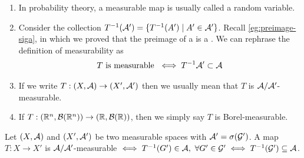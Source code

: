 \begin{remark}$ $\newline
	\begin{enumerate}
		\item In probability theory, a measurable map is usually called a random variable.
		\item Consider the collection ${T}^{-1}(\mathcal{A}') = \{{T}^{-1}(A') \mid A' \in \mathcal{A}'\}$. Recall \autoref{eg:preimage-siga}, in which we proved that the preimage of a \siga is a \siga. We can rephrase the definition of measurability as
		\begin{align*}
			T \text{ is measurable } \iff {T}^{-1}\mathcal{A}' \subset \mathcal{A}
		\end{align*}
		\item If we write $T: (X, \mathcal{A}) \to (X', \mathcal{A}')$ then we usually mean that $T$ is $\mathcal{A}/\mathcal{A}'$-measurable.
		
		\item If $T: (\mathbb{R}^n, \mathcal{B}(\mathbb{R}^n)) \to (\mathbb{R}, \mathcal{B}(\mathbb{R}))$, then we simply say $T$ is Borel-measurable.
	\end{enumerate}
\end{remark}

\begin{lem}
	\label{lem:measurable-generators}
	Let $(X, \mathcal{A})$ and $(X', \mathcal{A}')$ be two measurable spaces with $\mathcal{A}' = \sigma(\mathcal{G}')$. A map $T: X \to X'$ is $\mathcal{A}/\mathcal{A}'$-measurable $\iff {T}^{-1}(G') \in \mathcal{A},\ \forall G' \in \mathcal{G}' \iff {T}^{-1}(\mathcal{G}') \subseteq \mathcal{A}$.
\end{lem}

